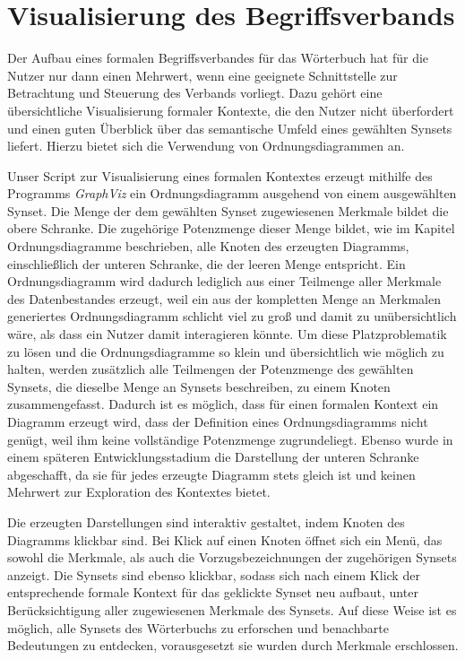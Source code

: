 \documentclass[pagesize,DIV=calc,12pt,final]{scrreprt}
\begin{document}
\section{Visualisierung des Begriffsverbands}

Der Aufbau eines formalen Begriffsverbandes für das Wörterbuch hat für die Nutzer nur dann einen Mehrwert, wenn eine geeignete Schnittstelle zur Betrachtung und Steuerung des Verbands vorliegt. 
Dazu gehört eine übersichtliche Visualisierung formaler Kontexte, die den Nutzer nicht überfordert und einen guten Überblick über das semantische Umfeld eines gewählten Synsets liefert.
Hierzu bietet sich die Verwendung von Ordnungsdiagrammen an. 

Unser Script zur Visualisierung eines formalen Kontextes erzeugt mithilfe des Programms \emph{GraphViz} ein Ordnungsdiagramm ausgehend von einem ausgewählten Synset. 
Die Menge der dem gewählten Synset zugewiesenen Merkmale bildet die obere Schranke. 
Die zugehörige Potenzmenge dieser Menge bildet, wie im Kapitel Ordnungsdiagramme beschrieben, alle Knoten des erzeugten Diagramms, einschließlich der unteren Schranke, die der leeren Menge entspricht. 
Ein Ordnungsdiagramm wird dadurch lediglich aus einer Teilmenge aller Merkmale des Datenbestandes erzeugt, weil ein aus der kompletten Menge an Merkmalen generiertes Ordnungsdiagramm schlicht viel zu groß und damit zu unübersichtlich wäre, als dass ein Nutzer damit interagieren könnte. 
Um diese Platzproblematik zu lösen und die Ordnungsdiagramme so klein und übersichtlich wie möglich zu halten, werden zusätzlich alle Teilmengen der Potenzmenge des gewählten Synsets, die dieselbe Menge an Synsets beschreiben, zu einem Knoten zusammengefasst. 
Dadurch ist es möglich, dass für einen formalen Kontext ein Diagramm erzeugt wird, dass der Definition eines Ordnungsdiagramms nicht genügt, weil ihm keine vollständige Potenzmenge zugrundeliegt. 
Ebenso wurde in einem späteren Entwicklungsstadium die Darstellung der unteren Schranke abgeschafft, da sie für jedes erzeugte Diagramm stets gleich ist und keinen Mehrwert zur Exploration des Kontextes bietet.

Die erzeugten Darstellungen sind interaktiv gestaltet, indem Knoten des Diagramms klickbar sind. 
Bei Klick auf einen Knoten öffnet sich ein Menü, das sowohl die Merkmale, als auch die Vorzugsbezeichnungen der zugehörigen Synsets anzeigt. 
Die Synsets sind ebenso klickbar, sodass sich nach einem Klick der entsprechende formale Kontext für das geklickte Synset neu aufbaut, unter Berücksichtigung aller zugewiesenen Merkmale des Synsets. 
Auf diese Weise ist es möglich, alle Synsets des Wörterbuchs zu erforschen und benachbarte Bedeutungen zu entdecken, vorausgesetzt sie wurden durch Merkmale erschlossen. 
\end{document}
